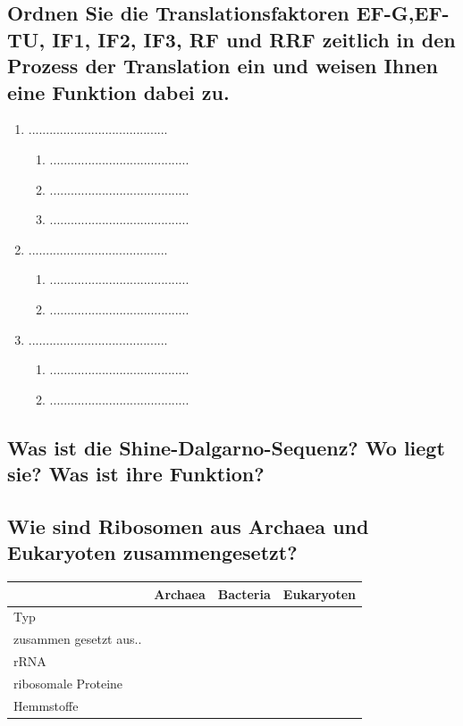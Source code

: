 \documentclass{article}
\begin{document}
\subsection*{Ordnen Sie die
Translationsfaktoren EF-G,EF-TU, IF1, IF2, IF3, RF und RRF zeitlich in den Prozess der Translation ein und weisen Ihnen eine Funktion dabei zu. 
}
\begin{enumerate}
    \item  ........................................
    \begin{enumerate}
        \item ........................................
        \item ........................................
        \item ........................................
    \end{enumerate}
    \item ........................................
    \begin{enumerate}
        \item ........................................
        \item ........................................
    \end{enumerate}
    \item ........................................
    \begin{enumerate}
        \item ........................................
        \item ........................................
    \end{enumerate}
\end{enumerate}
\subsection*{Was ist  die Shine-Dalgarno-Sequenz?
Wo liegt sie? Was ist  ihre Funktion?}
\bigskip\bigskip \bigskip\bigskip\bigskip\bigskip

\subsection*{Wie sind Ribosomen aus Archaea und Eukaryoten zusammengesetzt?} 
\begin{table}[H]
    \centering
    \begin{tabular}{ |p{2cm}|| p{4cm}| p{4cm}| p{4cm}|}
    \hline
     & Archaea & Bacteria & Eukaryoten \\ \hline \hline
    Typ &   &  & \\ \hline
    zusammen gesetzt aus..  &   &  & \\ \hline
    rRNA &  &   &  & \\ \hline
    ribosomale Proteine  &   &  & \\ \hline
    Hemmstoffe &   &  & \\ \hline
\end{tabular}
\end{table}
\end{document}
